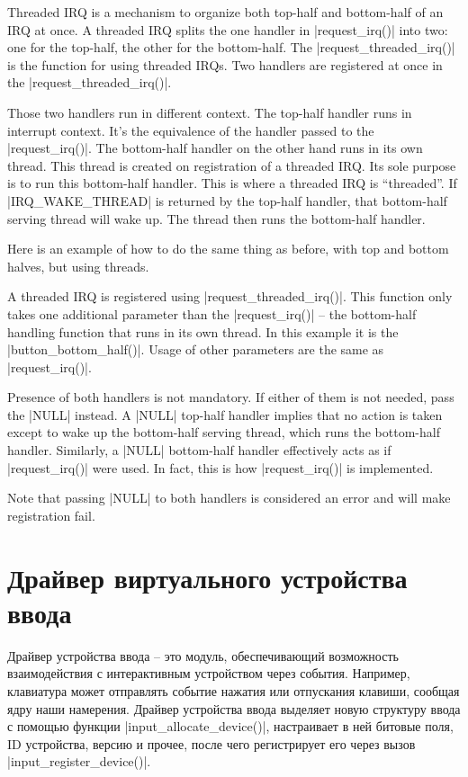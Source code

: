 \documentclass[10pt, oneside]{book}
\begin{document}
Threaded IRQ is a mechanism to organize both top-half and bottom-half of an IRQ at once.
A threaded IRQ splits the one handler in \cpp|request_irq()| into two: one for the top-half, the other for the bottom-half.
The \cpp|request_threaded_irq()| is the function for using threaded IRQs.
Two handlers are registered at once in the \cpp|request_threaded_irq()|.

Those two handlers run in different context.
The top-half handler runs in interrupt context.
It's the equivalence of the handler passed to the \cpp|request_irq()|.
The bottom-half handler on the other hand runs in its own thread.
This thread is created on registration of a threaded IRQ.
Its sole purpose is to run this bottom-half handler.
This is where a threaded IRQ is ``threaded''.
If \cpp|IRQ_WAKE_THREAD| is returned by the top-half handler, that bottom-half serving thread will wake up.
The thread then runs the bottom-half handler.

Here is an example of how to do the same thing as before, with top and bottom halves, but using threads.


A threaded IRQ is registered using \cpp|request_threaded_irq()|.
This function only takes one additional parameter than the \cpp|request_irq()| -- the bottom-half handling function that runs in its own thread.
In this example it is the \cpp|button_bottom_half()|.
Usage of other parameters are the same as \cpp|request_irq()|.

Presence of both handlers is not mandatory.
If either of them is not needed, pass the \cpp|NULL| instead.
A \cpp|NULL| top-half handler implies that no action is taken except to wake up the bottom-half serving thread, which runs the bottom-half handler.
Similarly, a \cpp|NULL| bottom-half handler effectively acts as if \cpp|request_irq()| were used.
In fact, this is how \cpp|request_irq()| is implemented.

Note that passing \cpp|NULL| to both handlers is considered an error and will make registration fail.

\section{Драйвер виртуального устройства ввода}
\label{sec:vinput}
Драйвер устройства ввода – это модуль, обеспечивающий возможность взаимодействия с интерактивным устройством через события. Например, клавиатура может отправлять событие нажатия или отпускания клавиши, сообщая ядру наши намерения. Драйвер устройства ввода выделяет новую структуру ввода с помощью функции \cpp|input_allocate_device()|, настраивает в ней битовые поля, ID устройства, версию и
прочее, после чего регистрирует его через вызов \cpp|input_register_device()|.
\end{document}
